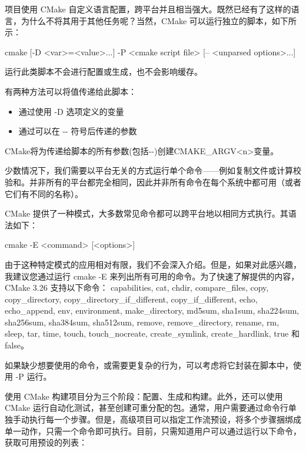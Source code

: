 项目使用 CMake 自定义语言配置，跨平台并且相当强大。既然已经有了这样的语言，为什么不将其用于其他任务呢？当然，CMake 可以运行独立的脚本，如下所示：

\begin{shell}
cmake [{-D <var>=<value>}...] -P <cmake script file>
      [-- <unparsed options>...]
\end{shell}

运行此类脚本不会进行配置或生成，也不会影响缓存。

有两种方法可以将值传递给此脚本：

\begin{itemize}
\item
通过使用 -D 选项定义的变量

\item
通过可以在 -{}- 符号后传递的参数
\end{itemize}

CMake将为传递给脚本的所有参数(包括-{}-)创建CMAKE\_ARGV<n>变量。


少数情况下，我们需要以平台无关的方式运行单个命令——例如复制文件或计算校验和。并非所有的平台都完全相同，因此并非所有命令在每个系统中都可用（或者它们有不同的名称）。

CMake 提供了一种模式，大多数常见命令都可以跨平台地以相同方式执行。其语法如下：

\begin{shell}
cmake -E <command> [<options>]
\end{shell}

由于这种特定模式的应用相对有限，我们不会深入介绍。但是，如果对此感兴趣，我建议您通过运行 cmake -E 来列出所有可用的命令。为了快速了解提供的内容，CMake 3.26 支持以下命令： capabilities, cat, chdir, compare\_files, copy, copy\_directory, copy\_directory\_if\_different, copy\_if\_different, echo, echo\_append, env, environment, make\_directory, md5sum, sha1sum, sha224sum, sha256sum, sha384sum, sha512sum, remove, remove\_directory, rename, rm, sleep, tar, time, touch, touch\_nocreate, create\_symlink, create\_hardlink, true 和 false。

如果缺少想要使用的命令，或需要更复杂的行为，可以考虑将它封装在脚本中，使用 -P 运行。


使用 CMake 构建项目分为三个阶段：配置、生成和构建。此外，还可以使用 CMake 运行自动化测试，甚至创建可重分配的包。通常，用户需要通过命令行单独手动执行每一个步骤。但是，高级项目可以指定工作流预设，将多个步骤捆绑成单一动作，只需一个命令即可执行。目前，只需知道用户可以通过运行以下命令，获取可用预设的列表：

